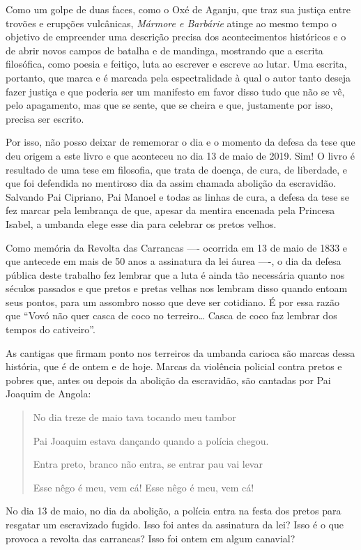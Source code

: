 Como um golpe de duas faces, como o Oxé de Aganju, que traz sua justiça
entre trovões e erupções vulcânicas, \textit{Mármore e Barbárie} atinge ao
mesmo tempo o objetivo de empreender uma descrição precisa dos
acontecimentos históricos e o de abrir novos campos de batalha e de
mandinga, mostrando que a escrita filosófica, como poesia e feitiço,
luta ao escrever e escreve ao lutar. Uma escrita, portanto, que marca e
é marcada pela espectralidade à qual o autor tanto deseja fazer justiça
e que poderia ser um manifesto em favor disso tudo que não se vê, pelo
apagamento, mas que se sente, que se cheira e que, justamente por isso,
precisa ser escrito.

Por isso, não posso deixar de rememorar o dia e o momento da defesa da
tese que deu origem a este livro e que aconteceu no dia 13 de maio de
2019. Sim! O livro é resultado de uma tese em filosofia, que trata de
doença, de cura, de liberdade, e que foi defendida no mentiroso dia da
assim chamada abolição da escravidão. Salvando Pai Cipriano, Pai Manoel
e todas as linhas de cura, a defesa da tese se fez marcar pela lembrança
de que, apesar da mentira encenada pela Princesa Isabel, a umbanda elege
esse dia para celebrar os pretos velhos.

Como memória da Revolta das Carrancas ---- ocorrida em 13 de maio de 1833
e que antecede em mais de 50 anos a assinatura da lei áurea ----, o dia da
defesa pública deste trabalho fez lembrar que a luta é ainda tão
necessária quanto nos séculos passados e que pretos e pretas velhas nos
lembram disso quando entoam seus pontos, para um assombro nosso que deve
ser cotidiano. É por essa razão que ``Vovó não quer casca de coco no
terreiro\dots{} Casca de coco faz lembrar dos tempos do cativeiro''.

As cantigas que firmam ponto nos terreiros da umbanda carioca são marcas
dessa história, que é de ontem e de hoje. Marcas da violência policial
contra pretos e pobres que, antes ou depois da abolição da escravidão,
são cantadas por Pai Joaquim de Angola:

\begin{quote}
No dia treze de maio tava tocando meu tambor

Pai Joaquim estava dançando quando a polícia chegou.

Entra preto, branco não entra, se entrar pau vai levar

Esse nêgo é meu, vem cá! Esse nêgo é meu, vem cá!
\end{quote}

No dia 13 de maio, no dia da abolição, a polícia entra na festa dos
pretos para resgatar um escravizado fugido. Isso foi antes da assinatura
da lei? Isso é o que provoca a revolta das carrancas? Isso foi ontem em
algum canavial?

